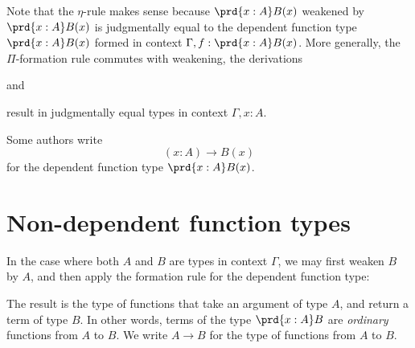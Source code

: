 \begin{rmk}
Note that the $\eta$-rule makes sense because $\prd{x:A}B(x)$ weakened by $\prd{x:A}B(x)$ is judgmentally equal to the dependent function type $\prd{x:A}B(x)$ formed in context $\Gamma,f:\prd{x:A}B(x)$. 
More generally, the $\Pi$-formation rule commutes with weakening, the derivations
\begin{prooftree}
\end{prooftree}
and
\begin{prooftree}
\end{prooftree}
result in judgmentally equal types in context $\Gamma,x:A$.
\end{rmk}

\begin{rmk}
Some authors write
\begin{equation*}
(x:A)\to B(x)
\end{equation*}
for the dependent function type $\prd{x:A}B(x)$. 
\end{rmk}

\section{Non-dependent function types}
In the case where both $A$ and $B$ are types in context $\Gamma$, we may first weaken $B$ by $A$, and then apply the formation rule for the dependent function type:
\begin{prooftree}
\end{prooftree}
The result is the type of functions that take an argument of type $A$, and return a term of type $B$. In other words, terms of the type $\prd{x:A}B$ are \emph{ordinary} functions from $A$ to $B$. We write $A\to B$ for the type of functions from $A$ to $B$.

